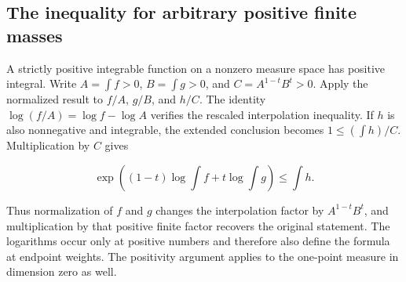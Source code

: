 \documentclass[11pt,a4paper]{report}
\begin{document}
\subsection{\texorpdfstring{The inequality for arbitrary positive finite masses}{The inequality for arbitrary positive finite masses}}
\label{report-step-IPLA-PrekopaLeindler-lean-5}


A strictly positive integrable function on a nonzero measure space has positive integral. Write \(A=\int f>0\), \(B=\int g>0\), and \(C=A^{1-t}B^t>0\). Apply the normalized result to \(f/A\), \(g/B\), and \(h/C\). The identity \(\log(f/A)=\log f-\log A\) verifies the rescaled interpolation inequality. If \(h\) is also nonnegative and integrable, the extended conclusion becomes \(1\le(\int h)/C\). Multiplication by \(C\) gives

\[\exp\!\left((1-t)\log\int f+t\log\int g\right)\le\int h.\]

Thus normalization of \(f\) and \(g\) changes the interpolation factor by \(A^{1-t}B^t\), and multiplication by that positive finite factor recovers the original statement. The logarithms occur only at positive numbers and therefore also define the formula at endpoint weights. The positivity argument applies to the one-point measure in dimension zero as well.
\end{document}
